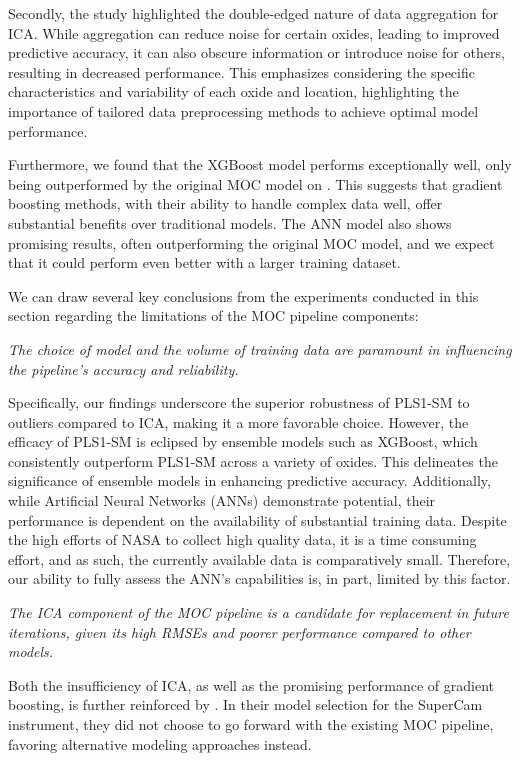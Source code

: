 Secondly, the study highlighted the double-edged nature of data aggregation for ICA.
While aggregation can reduce noise for certain oxides, leading to improved predictive accuracy, it can also obscure information or introduce noise for others, resulting in decreased performance.
This emphasizes considering the specific characteristics and variability of each oxide and location, highlighting the importance of tailored data preprocessing methods to achieve optimal model performance.

Furthermore, we found that the XGBoost model performs exceptionally well, only being outperformed by the original MOC model on .
This suggests that gradient boosting methods, with their ability to handle complex data well, offer substantial benefits over traditional models.
The ANN model also shows promising results, often outperforming the original MOC model, and we expect that it could perform even better with a larger training dataset.

We can draw several key conclusions from the experiments conducted in this section regarding the limitations of the MOC pipeline components:

\vspace{2mm}\noindent\textit{The choice of model and the volume of training data are paramount in influencing the pipeline's accuracy and reliability.}

\noindent
Specifically, our findings underscore the superior robustness of PLS1-SM to outliers compared to ICA, making it a more favorable choice.
However, the efficacy of PLS1-SM is eclipsed by ensemble models such as XGBoost, which consistently outperform PLS1-SM across a variety of oxides.
This delineates the significance of ensemble models in enhancing predictive accuracy.
Additionally, while Artificial Neural Networks (ANNs) demonstrate potential, their performance is dependent on the availability of substantial training data. 
Despite the high efforts of NASA to collect high quality data, it is a time consuming effort, and as such, the currently available data is comparatively small. 
Therefore, our ability to fully assess the ANN's capabilities is, in part, limited by this factor.

\vspace{2mm}\noindent\textit{The ICA component of the MOC pipeline is a candidate for replacement in future iterations, given its high RMSEs and poorer performance compared to other models.}

\noindent
Both the insufficiency of ICA, as well as the promising performance of gradient boosting, is further reinforced by \citet{andersonPostlandingMajorElement2022}. In their model selection for the SuperCam instrument, they did not choose to go forward with the existing MOC pipeline, favoring alternative modeling approaches instead.


